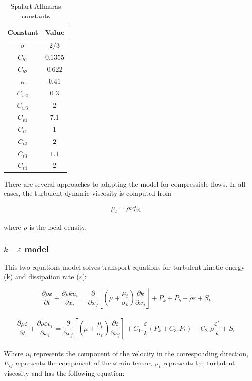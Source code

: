 \documentclass[a5paper]{sapthesis}
\begin{document}
	\begin{table}[h]
		\centering
		\renewcommand{\arraystretch}{1.2} %
		\begin{tabular}{c c}
			\hline
			\textbf{Constant} & \textbf{Value} \\ 
			\hline
			$\sigma$  & $2/3$ \\
			$C_{b1}$  & $0.1355$ \\
			$C_{b2}$  & $0.622$ \\
			$\kappa$  & $0.41$ \\
			$C_{w2}$  & $0.3$ \\
			$C_{w3}$  & $2$ \\
			$C_{v1}$  & $7.1$ \\
			$C_{t1}$  & $1$ \\
			$C_{t2}$  & $2$ \\
			$C_{t3}$  & $1.1$ \\
			$C_{t4}$  & $2$ \\
			\hline
		\end{tabular}
		\vspace{3mm}
		\caption{Spalart-Allmaras constants}
		\label{table:SAconstants}
	\end{table}
	
	\noindent There are several approaches to adapting the model for compressible flows. In all cases, the turbulent dynamic viscosity is computed from
	
	\begin{equation}
		\mu_t = \rho \tilde{\nu} f_{v1}
	\end{equation}
	\\
	where $\rho$ is the local density.
	
	
	\subsubsection{$k-\varepsilon$ model}
	This two-equations model solves transport equations for turbulent kinetic energy (k) and dissipation rate ($\varepsilon$):
	
	\begin{equation}
		\frac{\partial \rho k}{\partial t} + \frac{\partial \rho k u_i}{\partial x_i} = \frac{\partial}{\partial x_j}\left[\left(\mu +\frac{\mu_t}{\sigma_k}\right)\frac{\partial k}{\partial x_j}\right] + P_k + P_b - \rho \varepsilon + S_k
	\end{equation}
	\\	
	\begin{equation}
		\frac{\partial \rho \varepsilon}{\partial t} + \frac{\partial \rho \varepsilon u_i}{\partial x_i} = \frac{\partial}{\partial x_j}\left[\left(\mu+ \frac{\mu_t}{\sigma_\varepsilon}\right)\frac{\partial \varepsilon}{\partial x_j}\right] + C_{1 \varepsilon}\frac{\varepsilon}{k} (P_k +C_{3\varepsilon} P_b) - C_{2 \varepsilon}\rho \frac{\varepsilon^2}{k} + S_{\varepsilon
		}
	\end{equation}
	\\
	Where $u_i$ represents the component of the velocity in the corresponding direction, $E_{ij}$ represents the component of the strain tensor, $\mu_t$ represents the turbulent viscosity and has the following equation:
	
\end{document}
